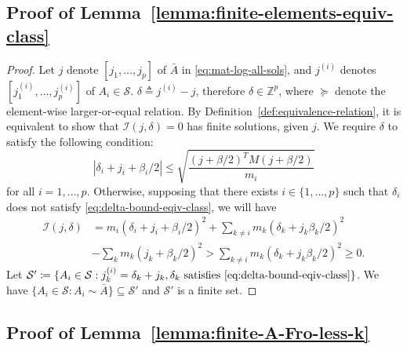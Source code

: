 \documentclass[letterpaper,10pt,journal,final]{IEEEtran}
\theoremstyle{definition}
\theoremstyle{remark}
\begin{document}
\subsection{Proof of Lemma~\ref{lemma:finite-elements-equiv-class}}
\label{appdix:proof-lemma-2}

\begin{proof}
  Let $\textit{j}$ denote $[j_1, \dots, j_p]$ of $\bar{A}$ in \eqref{eq:mat-log-all-sols}, and $\textit{j}^{(i)}$ denotes $[j_1^{(i)},\dots,j_p^{(i)}]$ of $A_i \in {\mathcal{S}}$. $\delta \triangleq \textit{j}^{(i)} - \textit{j}$, therefore $\delta \in \mathbb{Z}^{p}$,
where $\succeq$ denote the element-wise larger-or-equal relation. By Definition~\ref{def:equivalence-relation}, it is equivalent to show that $\mathscr{I}(\textit{j}, \delta)=0$ has finite solutions, given $\textit{j}$. We require $\delta$ to satisfy the following condition:
\begin{equation}
  \label{eq:delta-bound-eqiv-class}
  |\delta_i + j_i + \beta_i/2| \leq \sqrt{\frac{(\textit{j}+\beta/2)^T M (\textit{j}+\beta/2)}{m_i}}
\end{equation}
for all $i = 1,\dots,p$.
Otherwise, supposing that there exists $i \in \{1,\dots, p\}$ such that $\delta_i$ does not satisfy \eqref{eq:delta-bound-eqiv-class}, we will have
\begin{align*}
  \mathscr{I}(\textit{j},\delta) &= m_i(\delta_i + j_i + \beta_i/2)^2 + \sum_{k \neq i} m_k(\delta_k + j_k \beta_k/2)^2 \\
                      &- \sum_k m_k (j_k + \beta_k/2)^2
                      > \sum_{k \neq i} m_k(\delta_k + j_k \beta_k/2)^2 \geq 0.
\end{align*}
Let ${\mathcal{S}}' \coloneqq \{A_i \in {\mathcal{S}}: j_k^{(i)} = \delta_k + j_k, \delta_k \text{ satisfies \eqref{eq:delta-bound-eqiv-class}} \}$.
We have $\{A_i \in {\mathcal{S}}: A_i \sim \bar{A}\} \subseteq {\mathcal{S}}'$ and ${\mathcal{S}}'$ is a finite set.
\end{proof}


\subsection{Proof of Lemma~\ref{lemma:finite-A-Fro-less-k}}
\label{appdix:proof-lemma-3}
\end{document}
